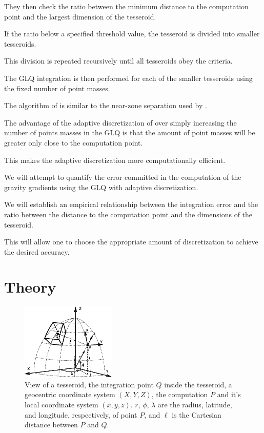 \documentclass[paper,twocolumn]{geophysics}
\begin{document}
They then check the ratio between the minimum distance to the computation point
and the largest dimension of the tesseroid.

If the ratio below a specified threshold value, the tesseroid is divided into
smaller tesseroids.

This division is repeated recursively until all tesseroids obey the criteria.

The GLQ integration is then performed for each of the smaller tesseroids
using the fixed number of point masses.

The algorithm of \citet{Li2011} is similar to the near-zone separation used by
\citet{Grombein2013}.

The advantage of the adaptive discretization of \citet{Li2011} over simply
increasing the number of points masses in the GLQ is that the
amount of point masses will be greater only close to the computation point.

This makes the adaptive discretization more computationally efficient.


We will attempt to quantify the error committed in the computation of the
gravity gradients using the GLQ with adaptive discretization.

We will establish an empirical relationship between the integration error and
the ratio between the distance to the computation point and the dimensions of
the tesseroid.

This will allow one to choose the appropriate amount of discretization to
achieve the desired accuracy.


\section{Theory}


\begin{figure}
    \centering
    \includegraphics[width=0.4\textwidth]{figs/tesseroid}
    \caption{
        View of a tesseroid,
        the integration point $Q$ inside the tesseroid,
        a geocentric coordinate system $(X, Y, Z)$,
        the computation $P$ and it's local coordinate system $(x, y, z)$.
        $r$, $\phi$, $\lambda$ are
        the radius, latitude, and longitude, respectively, of point $P$,
        and $\ell$ is the Cartesian distance between $P$ and $Q$.
    }
    \label{fig:tesseroid}
\end{figure}
\end{document}
